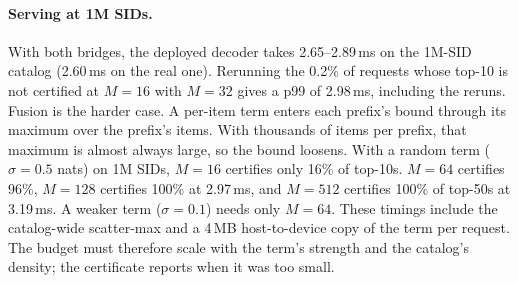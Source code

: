 \documentclass[sigconf,anonymous]{acmart}
\begin{document}
\paragraph{Serving at 1M SIDs.} With both bridges, the deployed decoder takes 2.65--2.89\,ms on the 1M-SID catalog
(2.60\,ms on the real one). Rerunning the 0.2\% of requests whose top-10 is not certified at $M=16$ with $M=32$
gives a p99 of 2.98\,ms, including the reruns. Fusion is the harder case. A per-item term enters each prefix's
bound through its maximum over the prefix's items. With thousands of items per prefix, that maximum is almost
always large, so the bound loosens. With a random term ($\sigma=0.5$ nats) on 1M SIDs, $M=16$ certifies only 16\%
of top-10s. $M=64$ certifies 96\%, $M=128$ certifies 100\% at 2.97\,ms, and $M=512$ certifies 100\% of top-50s at
3.19\,ms. A weaker term ($\sigma=0.1$) needs only $M=64$. These timings include the catalog-wide scatter-max and a
4\,MB host-to-device copy of the term per request. The budget must therefore scale with the term's strength and
the catalog's density; the certificate reports when it was too small.
\end{document}
